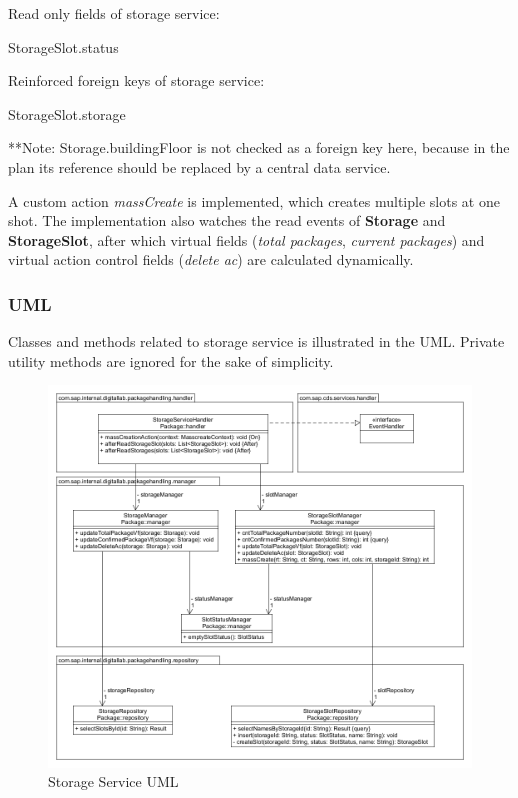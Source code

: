 \bigskip
Read only fields of storage service:
\begin{compactenum}
	\item StorageSlot.status
\end{compactenum}

\bigskip
Reinforced foreign keys of storage service:
\begin{compactenum}
	\item StorageSlot.storage
\end{compactenum}

\bigskip
**Note: Storage.buildingFloor is not checked as a foreign key here, because in the plan its reference should be replaced by a central data service.


A custom action \textit{massCreate} is implemented, which creates multiple slots at one shot. The implementation also watches the read events of \textbf{Storage} and \textbf{StorageSlot}, after which virtual fields (\textit{total packages}, \textit{current packages}) and virtual action control fields (\textit{delete ac}) are calculated dynamically.

\subsubsection{UML}

Classes and methods related to storage service is illustrated in the UML. Private utility methods are ignored for the sake of simplicity.
\begin{figure}[!h]
    \centering
    \includegraphics[width=1\linewidth]{images/service_class_diagrams/storage_service_class_diagram.png}
    \caption{Storage Service UML}
    \label{fig:storage_service_uml}
\end{figure}
\pagebreak

